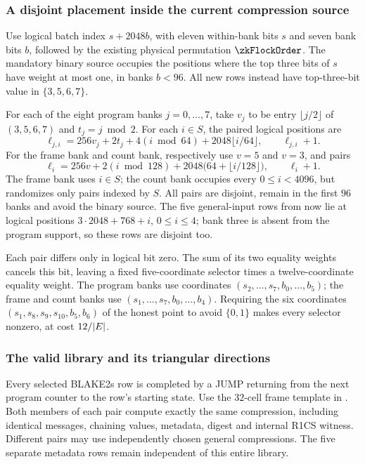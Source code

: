 \subsubsection{A disjoint placement inside the current compression source}

Use logical batch index $s+2048b$, with eleven within-bank bits $s$ and seven bank bits $b$, followed by the existing physical permutation $\zkFlockOrder$. The mandatory binary source occupies the positions where the top three bits of $s$ have weight at most one, in banks $b<96$. All new rows instead have top-three-bit value in $\{3,5,6,7\}$.

For each of the eight program banks $j=0,\ldots,7$, take $v_j$ to be entry $\lfloor j/2\rfloor$ of $(3,5,6,7)$ and $t_j=j\bmod2$. For each $i\in S$, the paired logical positions are
\[
 \ell_{j,i}=256v_j+2t_j+4(i\bmod64)+2048\lfloor i/64\rfloor,
 \qquad \ell_{j,i}+1.
\]
For the frame bank and count bank, respectively use $v=5$ and $v=3$, and pairs
\[
 \ell_i=256v+2(i\bmod128)+2048\bigl(64+\lfloor i/128\rfloor\bigr),
 \qquad \ell_i+1.
\]
The frame bank uses $i\in S$; the count bank occupies every $0\le i<4096$, but randomizes only pairs indexed by $S$. All pairs are disjoint, remain in the first $96$ banks and avoid the binary source. The five general-input rows from  now lie at logical positions $3\cdot2048+768+i$, $0\le i\le4$; bank three is absent from the program support, so these rows are disjoint too.

Each pair differs only in logical bit zero. The sum of its two equality weights cancels this bit, leaving a fixed five-coordinate selector times a twelve-coordinate equality weight. The program banks use coordinates $(s_2,\ldots,s_7,b_0,\ldots,b_5)$; the frame and count banks use $(s_1,\ldots,s_7,b_0,\ldots,b_4)$. Requiring the six coordinates $(s_1,s_8,s_9,s_{10},b_5,b_6)$ of the honest point to avoid $\{0,1\}$ makes every selector nonzero, at cost $12/|E|$.

\subsubsection{The valid library and its triangular directions}

Every selected BLAKE2s row is completed by a JUMP returning from the next program counter to the row's starting state. Use the $32$-cell frame template in . Both members of each pair compute exactly the same compression, including identical messages, chaining values, metadata, digest and internal R1CS witness. Different pairs may use independently chosen general compressions. The five separate metadata rows remain independent of this entire library.


